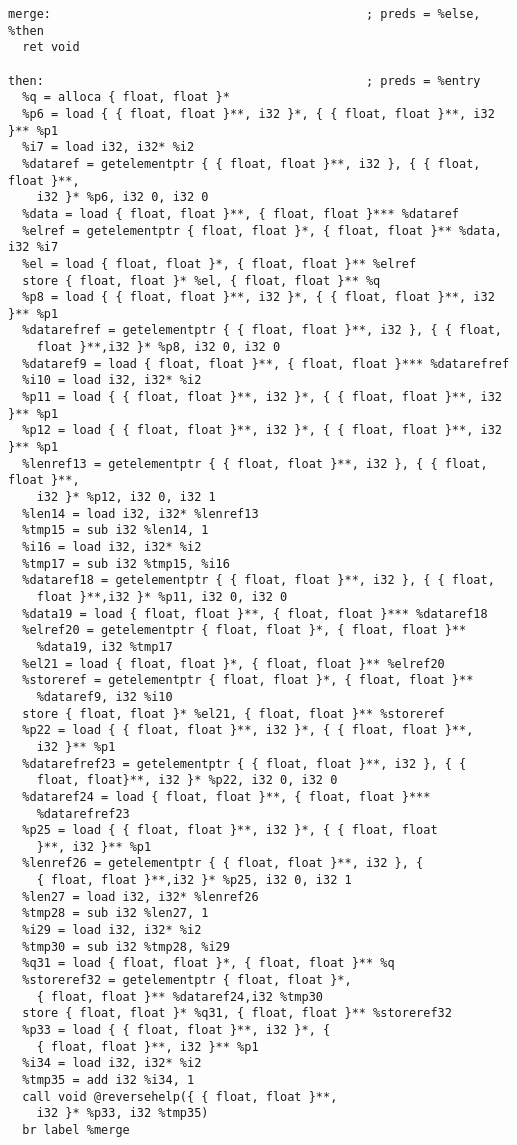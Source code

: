 \documentclass[main.tex]{subfiles}
\begin{document}
{\begin{lstlisting}
merge:                                            ; preds = %else, %then
  ret void

then:                                             ; preds = %entry
  %q = alloca { float, float }*
  %p6 = load { { float, float }**, i32 }*, { { float, float }**, i32 }** %p1
  %i7 = load i32, i32* %i2
  %dataref = getelementptr { { float, float }**, i32 }, { { float, float }**,
    i32 }* %p6, i32 0, i32 0
  %data = load { float, float }**, { float, float }*** %dataref
  %elref = getelementptr { float, float }*, { float, float }** %data, i32 %i7
  %el = load { float, float }*, { float, float }** %elref
  store { float, float }* %el, { float, float }** %q
  %p8 = load { { float, float }**, i32 }*, { { float, float }**, i32 }** %p1
  %datarefref = getelementptr { { float, float }**, i32 }, { { float,
    float }**,i32 }* %p8, i32 0, i32 0
  %dataref9 = load { float, float }**, { float, float }*** %datarefref
  %i10 = load i32, i32* %i2
  %p11 = load { { float, float }**, i32 }*, { { float, float }**, i32 }** %p1
  %p12 = load { { float, float }**, i32 }*, { { float, float }**, i32 }** %p1
  %lenref13 = getelementptr { { float, float }**, i32 }, { { float, float }**,
    i32 }* %p12, i32 0, i32 1
  %len14 = load i32, i32* %lenref13
  %tmp15 = sub i32 %len14, 1
  %i16 = load i32, i32* %i2
  %tmp17 = sub i32 %tmp15, %i16
  %dataref18 = getelementptr { { float, float }**, i32 }, { { float,
    float }**,i32 }* %p11, i32 0, i32 0
  %data19 = load { float, float }**, { float, float }*** %dataref18
  %elref20 = getelementptr { float, float }*, { float, float }** 
    %data19, i32 %tmp17
  %el21 = load { float, float }*, { float, float }** %elref20
  %storeref = getelementptr { float, float }*, { float, float }**
    %dataref9, i32 %i10
  store { float, float }* %el21, { float, float }** %storeref
  %p22 = load { { float, float }**, i32 }*, { { float, float }**,
    i32 }** %p1
  %datarefref23 = getelementptr { { float, float }**, i32 }, { { 
    float, float}**, i32 }* %p22, i32 0, i32 0
  %dataref24 = load { float, float }**, { float, float }***
    %datarefref23
  %p25 = load { { float, float }**, i32 }*, { { float, float
    }**, i32 }** %p1
  %lenref26 = getelementptr { { float, float }**, i32 }, {
    { float, float }**,i32 }* %p25, i32 0, i32 1
  %len27 = load i32, i32* %lenref26
  %tmp28 = sub i32 %len27, 1
  %i29 = load i32, i32* %i2
  %tmp30 = sub i32 %tmp28, %i29
  %q31 = load { float, float }*, { float, float }** %q
  %storeref32 = getelementptr { float, float }*,
    { float, float }** %dataref24,i32 %tmp30
  store { float, float }* %q31, { float, float }** %storeref32
  %p33 = load { { float, float }**, i32 }*, {
    { float, float }**, i32 }** %p1
  %i34 = load i32, i32* %i2
  %tmp35 = add i32 %i34, 1
  call void @reversehelp({ { float, float }**, 
    i32 }* %p33, i32 %tmp35)
  br label %merge


\end{lstlisting}}
\end{document}
